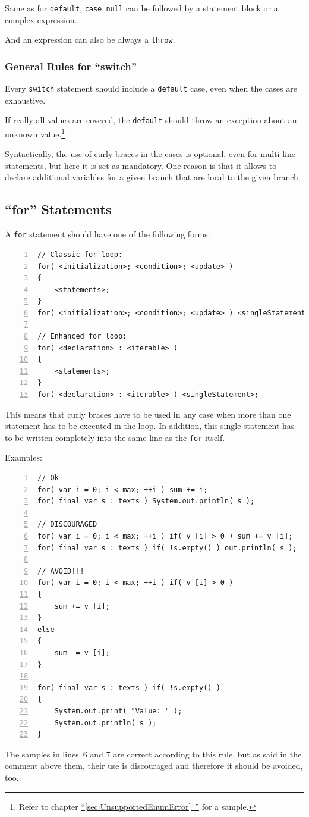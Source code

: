\documentclass[11pt,a4paper, titlepage, parskip=half, headsepline, footsepline, cleardoublepage=current, headheight=1cm]{scrbook}
\newcommand*{\tqfullref}[1]{\hyperref[{#1}]{“\ref*{#1}~\nameref*{#1}”}}
\begin{document}
Same as for \lstinline|default|, \lstinline|case null| can be followed by a statement block or a complex expression.

And an expression can also be always a \lstinline|throw|.

\subsubsection{General Rules for “switch”}
Every \lstinline|switch| statement should include a \lstinline|default| case, even when the cases are exhaustive.

If really all values are covered, the \lstinline|default| should throw an exception about an unknown value.\footnote{Refer to chapter \tqfullref{sec:UnsupportedEnumError} for a sample.}

Syntactically, the use of curly braces in the cases is optional, even for multi-line statements, but here it is set as mandatory. One reason is that it allows to declare additional variables for a given branch that are local to the given branch.

\subsection{“for” Statements}\label{sec:ForStatements}
A \lstinline|for| statement should have one of the following forms:

\begin{lstlisting}[numbers=left]
// Classic for loop:
for( <initialization>; <condition>; <update> )
{
    <statements>;
}
for( <initialization>; <condition>; <update> ) <singleStatement>;

// Enhanced for loop:
for( <declaration> : <iterable> )
{
    <statements>;
}
for( <declaration> : <iterable> ) <singleStatement>;
\end{lstlisting}

This means that curly braces have to be used in any case when more than one statement has to be executed in the loop. In addition, this single statement has to be written completely into the same line as the \lstinline|for| itself. 

Examples:
\begin{lstlisting}[numbers=left]
// Ok
for( var i = 0; i < max; ++i ) sum += i;
for( final var s : texts ) System.out.println( s );

// DISCOURAGED
for( var i = 0; i < max; ++i ) if( v [i] > 0 ) sum += v [i];
for( final var s : texts ) if( !s.empty() ) out.println( s );

// AVOID!!!
for( var i = 0; i < max; ++i ) if( v [i] > 0 )
{
    sum += v [i];
}
else
{
    sum -= v [i];
}

for( final var s : texts ) if( !s.empty() )
{
    System.out.print( "Value: " );
    System.out.println( s );
}
\end{lstlisting}
The samples in lines~6 and 7 are correct according to this rule, but as said in the comment above them, their use is discouraged and therefore it should be avoided, too.
\end{document}
